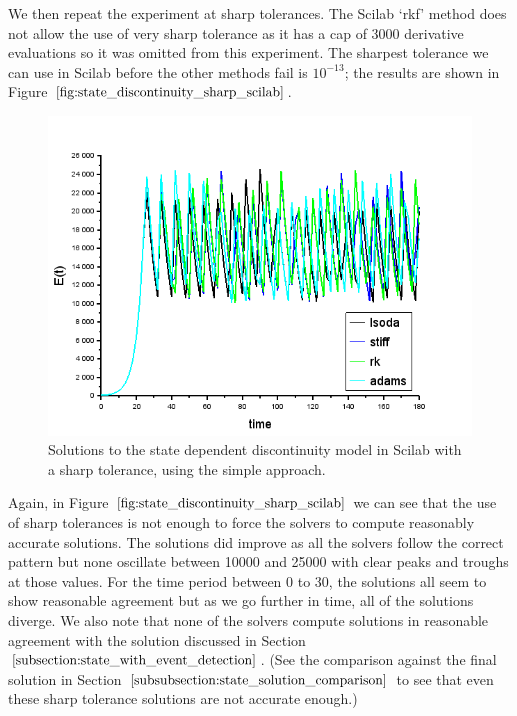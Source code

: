 We then repeat the experiment at sharp tolerances. The Scilab `rkf' method does not allow the use of very sharp tolerance as it has a cap of 3000 derivative evaluations so it was omitted from this experiment. The sharpest tolerance we can use in Scilab before the other methods fail is $10^{-13}$; the results are shown in Figure $\ref{fig:state_discontinuity_sharp_scilab}$.

\begin{figure}[H]
\centering
\includegraphics[width=0.7\linewidth]{./figures/state_discontinuity_sharp_sci}
\caption{Solutions to the state dependent discontinuity model in Scilab with a sharp tolerance, using the simple approach.}
\label{fig:state_discontinuity_sharp_scilab}
\end{figure}

Again, in Figure $\ref{fig:state_discontinuity_sharp_scilab}$ we can see that the use of sharp tolerances is not enough to force the solvers to compute reasonably accurate solutions. The solutions did improve as all the solvers follow the correct pattern but none oscillate between 10000 and 25000 with clear peaks and troughs at those values. For the time period between 0 to 30, the solutions all seem to show reasonable agreement but as we go further in time, all of the solutions diverge. We also note that none of the solvers compute solutions in reasonable agreement with the solution discussed in Section $\ref{subsection:state_with_event_detection}$. (See the comparison against the final solution in Section $\ref{subsubsection:state_solution_comparison}$ to see that even these sharp tolerance solutions are not accurate enough.)


